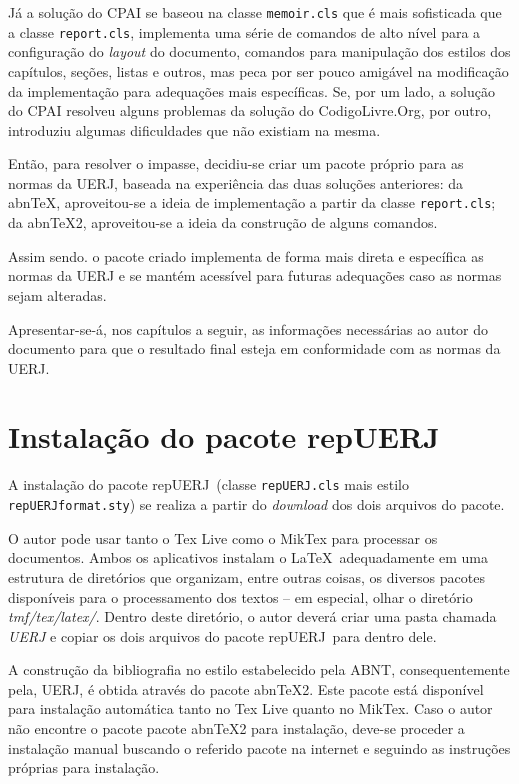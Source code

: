 \documentclass[a4paper,12pt,oneside,onecolumn]{article}
\newcommand{\repUERJ}{\textsf{repUERJ}}
\begin{document}
Já a solução do CPAI se baseou na classe \texttt{memoir.cls} que é mais sofisticada que a classe \texttt{report.cls}, implementa uma série de comandos de alto nível para a configuração do \textsl{layout} do documento, comandos para manipulação dos estilos dos capítulos, seções, listas e outros, mas peca por ser pouco amigável na modificação da implementação para adequações mais específicas. Se, por um lado, a solução do CPAI resolveu alguns problemas da solução do CodigoLivre.Org, por outro, introduziu algumas dificuldades que não existiam na mesma.

Então, para resolver o impasse, decidiu-se criar um pacote próprio para as normas da UERJ, baseada na experiência das duas soluções anteriores: da abn\TeX, aproveitou-se a ideia de implementação a partir da classe \texttt{report.cls}; da abn\TeX2, aproveitou-se a ideia da construção de alguns comandos.

Assim sendo. o pacote criado implementa de forma mais direta e específica as normas da UERJ e se mantém acessível para futuras adequações caso as normas sejam alteradas.

Apresentar-se-á, nos capítulos a seguir, as informações necessárias ao autor do documento para que o resultado final esteja em conformidade com as normas da UERJ.

\section{Instalação do pacote \repUERJ}

A instalação do pacote \repUERJ\ (classe \texttt{repUERJ.cls} mais estilo \texttt{repUERJformat.sty}) se realiza a partir do \textsl{download} dos dois arquivos do pacote.

O autor pode usar tanto o Tex Live como o MikTex para processar os documentos. Ambos os aplicativos instalam o \LaTeX\ adequadamente em uma estrutura de diretórios que organizam, entre outras coisas, os diversos pacotes disponíveis para o processamento dos textos -- em especial, olhar o diretório \textsl{tmf/tex/latex/}. Dentro deste diretório, o autor deverá criar uma pasta chamada \textsl{UERJ} e copiar os dois arquivos do pacote \repUERJ\ para dentro dele.

A construção da bibliografia no estilo estabelecido pela ABNT, consequentemente pela, UERJ, é obtida através do pacote abn\TeX2. Este pacote está disponível para instalação automática tanto no Tex Live quanto no MikTex. Caso o autor não encontre o pacote pacote abn\TeX2 para instalação, deve-se proceder a instalação manual buscando o referido pacote na internet e seguindo as instruções próprias para instalação.
\end{document}
